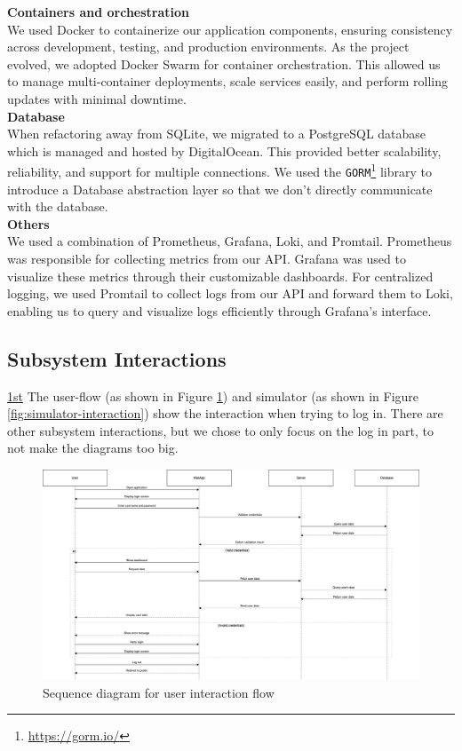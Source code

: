 \noindent \textbf{Containers and orchestration}
\\
We used Docker to containerize our application components, ensuring consistency across development, testing, and production environments. As the project evolved, we adopted Docker Swarm for container orchestration. This allowed us to manage multi-container deployments, scale services easily, and perform rolling updates with minimal downtime.
\\

\noindent \textbf{Database}
\\
When refactoring away from SQLite, we migrated to a PostgreSQL database which is managed and hosted by DigitalOcean. This provided better scalability, reliability, and support for multiple connections. We used the \texttt{GORM}\footnote{\url{https://gorm.io/}} library to introduce a Database abstraction layer so that we don't directly communicate with the database.
\\

\noindent \textbf{Others}
\\
We used a combination of Prometheus, Grafana, Loki, and Promtail. Prometheus was responsible for collecting metrics from our API. Grafana was used to visualize these metrics through their customizable dashboards. For centralized logging, we used Promtail to collect logs from our API and forward them to Loki, enabling us to query and visualize logs efficiently through Grafana’s interface.


\subsection{Subsystem Interactions}
\href{https://drive.google.com/file/d/18J39M3thQ0d2ehqQaVaydPF2SMUSb1fc/view?usp=sharing}{1st}
The user-flow (as shown in Figure \ref{fig:user-interaction}) and simulator (as shown in Figure \ref{fig:simulator-interaction}) show the interaction when trying to log in. There are other subsystem interactions, but we chose to only focus on the log in part, to not make the diagrams too big.

\begin{figure}[H]
  \centering
  \includegraphics[width=\textwidth]{images/flow.png}
  \caption{Sequence diagram for user interaction flow }
  \label{fig:user-interaction}
\end{figure}

